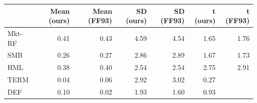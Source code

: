 \begin{tabular}{lrrrrrr}
\toprule
 & Mean (ours) & Mean (FF93) & SD (ours) & SD (FF93) & t (ours) & t (FF93) \\
\midrule
Mkt-RF & 0.41 & 0.43 & 4.59 & 4.54 & 1.65 & 1.76 \\
SMB & 0.26 & 0.27 & 2.86 & 2.89 & 1.67 & 1.73 \\
HML & 0.38 & 0.40 & 2.54 & 2.54 & 2.75 & 2.91 \\
TERM & 0.04 & 0.06 & 2.92 & 3.02 & 0.27 &  \\
DEF & 0.10 & 0.02 & 1.93 & 1.60 & 0.93 &  \\
\bottomrule
\end{tabular}

